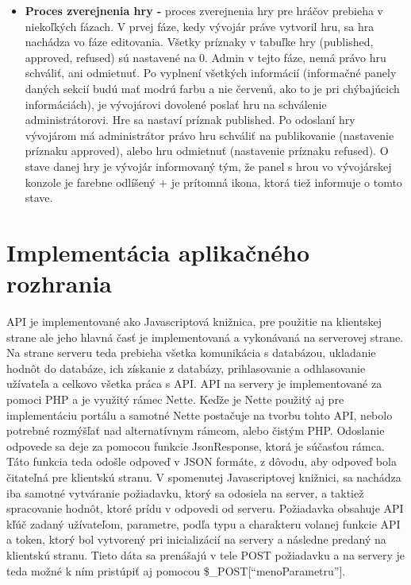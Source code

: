 \begin{itemize}
\item \textbf{Proces zverejnenia hry -} proces zverejnenia hry pre hráčov prebieha v niekoľkých fázach. V prvej fáze, kedy vývojár práve vytvoril hru, sa hra nachádza vo fáze editovania. Všetky príznaky v tabuľke hry (published, approved, refused) sú nastavené na 0. Admin v tejto fáze, nemá právo hru schváliť, ani odmietnuť. Po vyplnení všetkých informácií (informačné panely daných sekcií budú mať modrú farbu a nie červenú, ako to je pri chýbajúcich informáciách), je vývojárovi dovolené poslať hru na schválenie administrátorovi. Hre sa nastaví príznak published. Po odoslaní hry vývojárom má administrátor právo hru schváliť na publikovanie (nastavenie príznaku approved), alebo hru odmietnuť (nastavenie príznaku refused). O stave danej hry je vývojár informovaný tým, že panel s hrou vo vývojárskej konzole je farebne odlíšený + je prítomná ikona, ktorá tiež informuje o tomto stave. 
\end{itemize} 

\section{Implementácia aplikačného rozhrania}
API je implementované ako Javascriptová knižnica, pre použitie na klientskej strane ale jeho hlavná časť je implementovaná a vykonávaná na serverovej strane. Na strane serveru teda prebieha všetka komunikácia s databázou, ukladanie hodnôt do databáze, ich získanie z databázy, prihlasovanie a odhlasovanie užívateľa a celkovo všetka práca s API. API na servery je implementované za pomoci PHP a je využitý rámec Nette. Keďže je Nette použitý aj pre implementáciu portálu a samotné Nette postačuje na tvorbu tohto API, nebolo potrebné rozmýšľať nad alternatívnym rámcom, alebo čistým PHP. Odoslanie odpovede sa deje za pomocou funkcie JsonResponse, ktorá je súčasťou rámca. Táto funkcia teda odošle odpoveď v JSON formáte, z dôvodu, aby odpoveď bola čitateľná pre klientskú stranu.  V spomenutej Javascriptovej knižnici, sa nachádza iba samotné vytváranie požiadavku, ktorý sa odosiela na server, a taktiež spracovanie hodnôt, ktoré prídu v odpovedi od serveru. Požiadavka obsahuje API kľúč zadaný užívateľom, parametre, podľa typu a charakteru volanej funkcie API a token, ktorý bol vytvorený pri inicializácií na servery a následne predaný na klientskú stranu. Tieto dáta sa prenášajú v tele POST požiadavku a na servery je teda možné k ním pristúpiť aj pomocou \$\_POST[“menoParametru”].  

